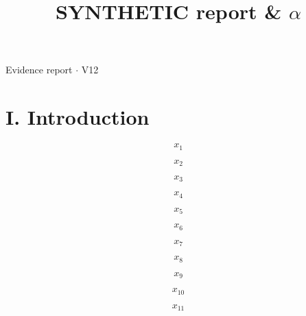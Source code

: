 \documentclass[journal]{IEEEtran}
\begin{document}
\title{SYNTHETIC report \& \ensuremath{\alpha}}

\maketitle

\noindent Evidence report \ensuremath{\cdot} V12

\section*{I. Introduction}

\begin{equation}
\label{eq:EQ1}
x_{1}
\end{equation}
\cite{Synth26}

\begin{equation}
\label{eq:EQ2}
x_{2}
\end{equation}
\cite{Synth26}

\begin{equation}
\label{eq:EQ3}
x_{3}
\end{equation}
\cite{Synth26}

\begin{equation}
\label{eq:EQ4}
x_{4}
\end{equation}
\cite{Synth26}

\begin{equation}
\label{eq:EQ5}
x_{5}
\end{equation}
\cite{Synth26}

\begin{equation}
\label{eq:EQ6}
x_{6}
\end{equation}
\cite{Synth26}

\begin{equation}
\label{eq:EQ7}
x_{7}
\end{equation}
\cite{Synth26}

\begin{equation}
\label{eq:EQ8}
x_{8}
\end{equation}
\cite{Synth26}

\begin{equation}
\label{eq:EQ9}
x_{9}
\end{equation}
\cite{Synth26}

\begin{equation}
\label{eq:EQ10}
x_{10}
\end{equation}
\cite{Synth26}

\begin{equation}
\label{eq:EQ11}
x_{11}
\end{equation}
\cite{Synth26}
\end{document}
